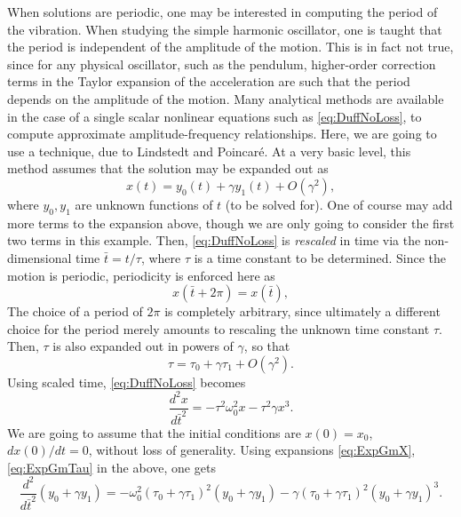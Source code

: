\documentclass[11pt,twoside,a4paper,english]{book}
\begin{document}
When solutions are periodic, one may be interested in computing the period of the vibration. When studying the simple harmonic oscillator, one is taught that the period is independent of the amplitude of the motion. This is in fact not true, since for any physical oscillator, such as the pendulum, higher-order correction terms in the Taylor expansion of the acceleration are such that the period depends on the amplitude of the motion. Many analytical methods are available in the case of a single scalar nonlinear equations such as \eqref{eq:DuffNoLoss}, to compute approximate amplitude-frequency relationships. Here, we are going to use a technique, due to Lindstedt and Poincar{\'e}. At a very basic level, this method assumes that the solution may be expanded out as
\begin{equation}\label{eq:ExpGmX}
    x(t) = y_0(t) + \gamma y_1(t)  + O(\gamma^2),
\end{equation}
where $y_0,y_1$ are unknown functions of $t$ (to be solved for). One of course may add more terms to the expansion above, though we are only going to consider the first two terms in this example. Then, \eqref{eq:DuffNoLoss} is \emph{rescaled} in time via the non-dimensional time $\bar t = t / \tau$, where $\tau$ is a time constant to be determined. Since the motion is periodic, periodicity is enforced here as
\begin{equation}\label{eq:PeriodDuffNoLoss}
    x(\bar t + 2\pi) = x(\bar t),
\end{equation}
The choice of a period of $2\pi$ is completely arbitrary, since ultimately a different choice for the period merely amounts to rescaling the unknown time constant $\tau$. Then, $\tau$ is also expanded out in powers of $\gamma$, so that
\begin{equation}\label{eq:ExpGmTau}
    \tau = \tau_0 + \gamma \tau_1 + O(\gamma^2).
\end{equation}
Using scaled time, \eqref{eq:DuffNoLoss} becomes
\begin{equation}
    \frac{d^2 x}{d \bar t^2} = -\tau^2\omega_0^2 x - \tau^2\gamma x^3.
\end{equation}
We are going to assume that the initial conditions are $x(0) = x_0$, $dx(0)/dt = 0$, without loss of generality. Using expansions \eqref{eq:ExpGmX}, \eqref{eq:ExpGmTau} in the above, one gets
\begin{equation}
    \frac{d^2}{d\bar t^2}\left(y_0 + \gamma y_1 \right) = - \omega_0^2 \left(\tau_0 + \gamma \tau_1\right)^2 \left(y_0 + \gamma y_1 \right) - \gamma \left(\tau_0 + \gamma \tau_1\right)^2 \left(y_0 + \gamma y_1 \right)^3.
\end{equation}
\end{document}

